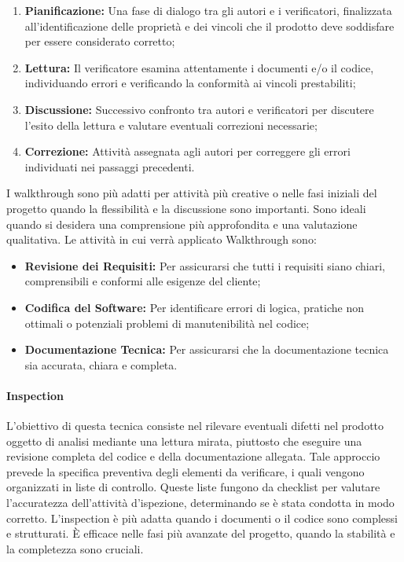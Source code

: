 \begin{enumerate}
    \item \textbf{Pianificazione:} Una fase di dialogo tra gli autori e i verificatori, finalizzata all'identificazione delle proprietà e dei vincoli che il prodotto deve soddisfare per essere considerato corretto;

    \item \textbf{Lettura:} Il verificatore esamina attentamente i documenti e/o il codice, individuando errori e verificando la conformità ai vincoli prestabiliti;

    \item \textbf{Discussione:} Successivo confronto tra autori e verificatori per discutere l'esito della lettura e valutare eventuali correzioni necessarie;

    \item \textbf{Correzione:} Attività assegnata agli autori per correggere gli errori individuati nei passaggi precedenti.
\end{enumerate}

I walkthrough sono più adatti per attività più creative o nelle fasi iniziali del progetto quando la flessibilità e la discussione sono importanti. Sono ideali quando si desidera una comprensione più approfondita e una valutazione qualitativa.
Le attività in cui verrà applicato Walkthrough sono:
\begin{itemize}
    \item \textbf{Revisione dei Requisiti:} Per assicurarsi che tutti i requisiti siano chiari, comprensibili e conformi alle esigenze del cliente;
    \item \textbf{Codifica del Software:} Per identificare errori di logica, pratiche non ottimali o potenziali problemi di manutenibilità nel codice;
    \item \textbf{Documentazione Tecnica:} Per assicurarsi che la documentazione tecnica sia accurata, chiara e completa.
\end{itemize}
\paragraph*{Inspection}
L'obiettivo di questa tecnica consiste nel rilevare eventuali difetti nel prodotto oggetto di analisi mediante una lettura mirata, piuttosto che eseguire una revisione completa del codice e della documentazione allegata.
Tale approccio prevede la specifica preventiva degli elementi da verificare, i quali vengono organizzati in liste di controllo.
Queste liste fungono da checklist per valutare l'accuratezza dell'attività d'ispezione, determinando se è stata condotta in modo corretto.
L'inspection è più adatta quando i documenti o il codice sono complessi e strutturati. È efficace nelle fasi più avanzate del progetto, quando la stabilità e la completezza sono cruciali.

